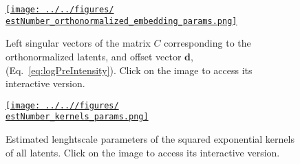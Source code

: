 \documentclass[12pt]{article}
\newcommand{\estNumber}{96129535}
\begin{document}
\begin{figure}
    \begin{center}

        \href{http://www.gatsby.ucl.ac.uk/~rapela/sthita/reports/firstReport/figures/\estNumber_orthonormalized_embedding_params.html}{\texttt{[image: ../../figures/\\estNumber\_orthonormalized\_embedding\_params.png]}}

        \caption{Left singular vectors of the matrix $C$ corresponding to the
        orthonormalized latents, and offset vector $\mathbf{d}$,
        (Eq.~\ref{eq:logPreIntensity}). Click on the image to access its
        interactive version.}

        \label{fig:orthonormalized_embedding}

    \end{center}
\end{figure}

\begin{figure}
    \begin{center}

        \href{http://www.gatsby.ucl.ac.uk/~rapela/sthita/reports/firstReport/figures/\estNumber_kernels_params.html}{\texttt{[image: ../..//figures/\\estNumber\_kernels\_params.png]}}

        \caption{Estimated lenghtscale parameters of the squared
        exponential kernels of all latents. Click on the image to access its
        interactive version.}

        \label{fig:kernels_parameters}

    \end{center}
\end{figure}
\end{document}
